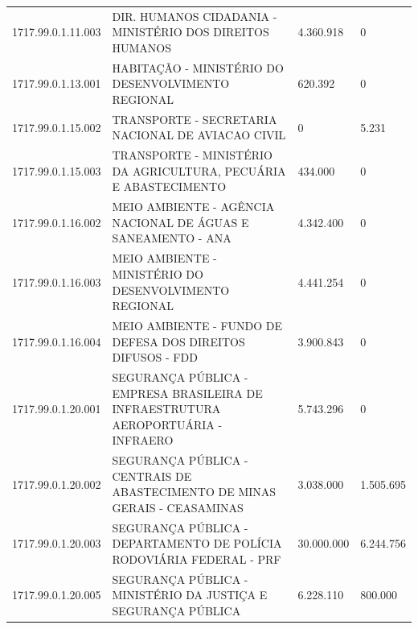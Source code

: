 \documentclass{article}
\begin{document}
\begin{longtable}[c]{m{2cm}|m{11cm}|m{2cm}m{2cm}}
\multicolumn{1}{C{2cm}|}{1717.99.0.1.11.003} & \multicolumn{1}{L{11cm}|}{DIR. HUMANOS CIDADANIA - MINISTÉRIO DOS DIREITOS HUMANOS} & \multicolumn{1}{R{2cm}|}{4.360.918} & \multicolumn{1}{R{2cm}}{            0} \\
\multicolumn{1}{C{2cm}|}{1717.99.0.1.13.001} & \multicolumn{1}{L{11cm}|}{HABITAÇÃO - MINISTÉRIO DO DESENVOLVIMENTO REGIONAL} & \multicolumn{1}{R{2cm}|}{620.392} & \multicolumn{1}{R{2cm}}{            0} \\
\multicolumn{1}{C{2cm}|}{1717.99.0.1.15.002} & \multicolumn{1}{L{11cm}|}{TRANSPORTE - SECRETARIA NACIONAL DE AVIACAO CIVIL} & \multicolumn{1}{R{2cm}|}{            0} & \multicolumn{1}{R{2cm}}{5.231} \\
\multicolumn{1}{C{2cm}|}{1717.99.0.1.15.003} & \multicolumn{1}{L{11cm}|}{TRANSPORTE - MINISTÉRIO DA AGRICULTURA, PECUÁRIA E ABASTECIMENTO} & \multicolumn{1}{R{2cm}|}{434.000} & \multicolumn{1}{R{2cm}}{            0} \\
\multicolumn{1}{C{2cm}|}{1717.99.0.1.16.002} & \multicolumn{1}{L{11cm}|}{MEIO AMBIENTE - AGÊNCIA NACIONAL DE ÁGUAS E SANEAMENTO - ANA} & \multicolumn{1}{R{2cm}|}{4.342.400} & \multicolumn{1}{R{2cm}}{            0} \\
\multicolumn{1}{C{2cm}|}{1717.99.0.1.16.003} & \multicolumn{1}{L{11cm}|}{MEIO AMBIENTE - MINISTÉRIO DO DESENVOLVIMENTO REGIONAL} & \multicolumn{1}{R{2cm}|}{4.441.254} & \multicolumn{1}{R{2cm}}{            0} \\
\multicolumn{1}{C{2cm}|}{1717.99.0.1.16.004} & \multicolumn{1}{L{11cm}|}{MEIO AMBIENTE - FUNDO DE DEFESA DOS DIREITOS DIFUSOS - FDD} & \multicolumn{1}{R{2cm}|}{3.900.843} & \multicolumn{1}{R{2cm}}{            0} \\
\multicolumn{1}{C{2cm}|}{1717.99.0.1.20.001} & \multicolumn{1}{L{11cm}|}{SEGURANÇA PÚBLICA - EMPRESA BRASILEIRA DE INFRAESTRUTURA AEROPORTUÁRIA - INFRAERO} & \multicolumn{1}{R{2cm}|}{5.743.296} & \multicolumn{1}{R{2cm}}{            0} \\
\multicolumn{1}{C{2cm}|}{1717.99.0.1.20.002} & \multicolumn{1}{L{11cm}|}{SEGURANÇA PÚBLICA - CENTRAIS DE ABASTECIMENTO DE MINAS GERAIS - CEASAMINAS} & \multicolumn{1}{R{2cm}|}{3.038.000} & \multicolumn{1}{R{2cm}}{1.505.695} \\
\multicolumn{1}{C{2cm}|}{1717.99.0.1.20.003} & \multicolumn{1}{L{11cm}|}{SEGURANÇA PÚBLICA - DEPARTAMENTO DE POLÍCIA RODOVIÁRIA FEDERAL - PRF} & \multicolumn{1}{R{2cm}|}{30.000.000} & \multicolumn{1}{R{2cm}}{6.244.756} \\
\multicolumn{1}{C{2cm}|}{1717.99.0.1.20.005} & \multicolumn{1}{L{11cm}|}{SEGURANÇA PÚBLICA - MINISTÉRIO DA JUSTIÇA E SEGURANÇA PÚBLICA} & \multicolumn{1}{R{2cm}|}{6.228.110} & \multicolumn{1}{R{2cm}}{800.000} \\

\end{longtable}
\end{document}
